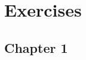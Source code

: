 \chapter{Exercises}
\setcounter{exercise}{1}
\newcommand{\newchap}[1][1]{\end{enumerate}\setcounter{exercise}{#1}\section*{Chapter #1}\addcontentsline{toc}{section}{Chapter #1 exercises}\begin{enumerate}[label=\theexercise.\arabic*.,ref=\theexercise.\arabic*,leftmargin=2.7em]}
\newcommand{\NewItem}{\item\label{exercise:\theexercise-\arabic{enumi}}}
\section*{Chapter 1}
